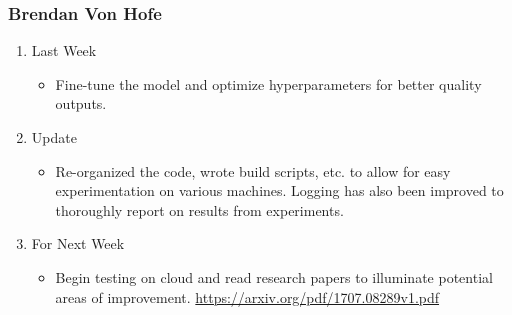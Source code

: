 \documentclass[15pt]{article}
\begin{document}
\subsubsection{Brendan Von Hofe}
\label{sec:orgcf2c0b9}
\begin{enumerate}
\item Last Week
\label{sec:orgd9db3d5}
\begin{itemize}
\item Fine-tune the model and optimize hyperparameters for better quality outputs.
\end{itemize}
\item Update
\label{sec:org529ea85}
\begin{itemize}
\item Re-organized the code, wrote build scripts, etc. to allow for easy experimentation on various machines. Logging has also been improved to thoroughly report on results from experiments.
\end{itemize}
\item For Next Week
\label{sec:org6f04037}
\begin{itemize}
\item Begin testing on cloud and read research papers to illuminate potential areas of improvement. \url{https://arxiv.org/pdf/1707.08289v1.pdf}
\end{itemize}
\end{enumerate}
\end{document}
